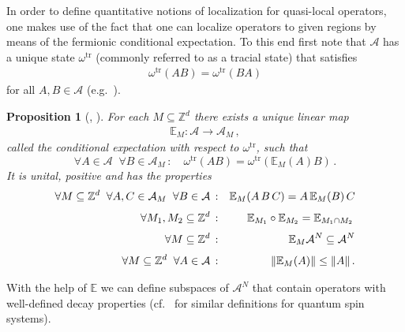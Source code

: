 \documentclass[a4paper]{article}
\newcommand{\E}{\mathbb{E}}
\newcommand{\tr}{\mathrm{tr}}
\newcommand{\w}{\omega}
\newcommand{\Z}{\mathbb{Z}}
\newcommand{\mA}{\mathcal{A}}
\DeclarePairedDelimiter\norm{\lVert}{\rVert}
\DeclarePairedDelimiter\br{\lparen}{\rparen}
\theoremstyle{plain}
\newtheorem{proposition}[theorem]{Proposition}
\theoremstyle{definition}
\theoremstyle{remark}
\renewcommand{\(}{\left(}
\renewcommand{\)}{\right)}
\begin{document}
In order to define quantitative notions of localization for quasi-local operators, one makes use of the fact that one can localize operators to given regions by means of the fermionic conditional expectation. 
To this end first note that  $\mA$ has a unique state $\w^{\tr}$ (commonly referred to as a tracial state) that satisfies
    \begin{align*}
        \w^{\tr}(AB) = \w^{\tr}(BA)
    \end{align*}
    for all  $A,B \in \mA$ (e.g.\ \cite[Definition 4.1, Remark 2]{ArakiMoriya2002}).


\medskip


\begin{proposition}[{\cite[Theorem 4.7]{ArakiMoriya2002},\cite[Proposition 2.1]{WMMMT24} }]\label{Ex+UniqueExpectation}
    For each $M\subseteq\Z^d$ there exists a unique linear map 
    \begin{align*}
        \E_M:\mA \to \mA_M\,,
    \end{align*}
    called the conditional expectation with respect to $\w^\tr$, such that
    \begin{equation}\label{eq:Conditional expectation defining property}
      \forall A\in \mA \; \;\forall B\in \mA_M \,:\quad \w^{\tr}(AB)=\w^{\tr}(\E_M(A)B) \,.
    \end{equation}
    It is unital, positive and has the properties 
    \begin{eqnarray*}
        \forall M\subseteq \Z^d\;\; \forall A,C\in \mA_M\;\; \forall B\in\mA\, : &&   \E_M \br{A\,B\,C} = A\, \E_M(B)\,C\\[1mm]
      \forall M_1,M_2 \subseteq \Z^d\,:&&   \E_{M_1} \circ \E_{M_2}  = \E_{M_1\cap M_2}\,\\[1mm]
        \forall M \subseteq \Z^d\,:&& \E_M \mA^N \subseteq \mA^N
  \\[1mm]
        \forall M \subseteq \Z^d \; \;  \forall A \in \mA\,:&&  \norm{\E_M(A)}\leq \norm{A}\,.
    \end{eqnarray*}
\end{proposition}



With the help of $\E$ we can define subspaces of $\mA^N$ that contain operators with well-defined decay properties (cf.\ \cite{MO20} for similar definitions for quantum spin systems).

\medskip
\end{document}
